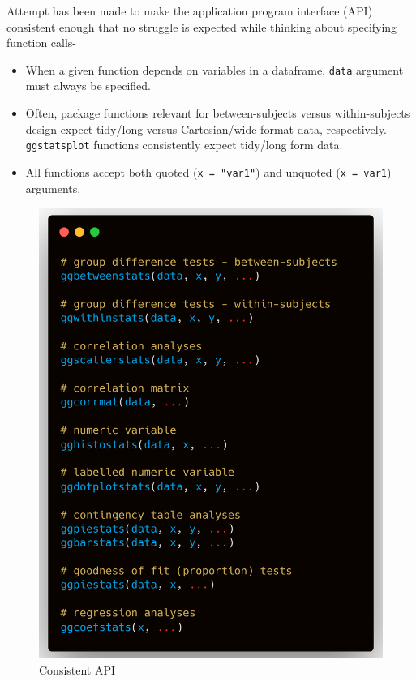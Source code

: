 \documentclass[
]{article}
\providecommand{\tightlist}{%
  \setlength{\itemsep}{0pt}\setlength{\parskip}{0pt}}
\begin{document}
Attempt has been made to make the application program interface (API) consistent
enough that no struggle is expected while thinking about specifying function
calls-

\begin{itemize}
\tightlist
\item
  When a given function depends on variables in a dataframe, \texttt{data} argument
  must always be specified.
\item
  Often, package functions relevant for between-subjects versus
  within-subjects design expect tidy/long versus Cartesian/wide format data,
  respectively. \texttt{ggstatsplot} functions consistently expect tidy/long form
  data.
\item
  All functions accept both quoted (\texttt{x\ =\ "var1"}) and unquoted (\texttt{x\ =\ var1})
  arguments.
\end{itemize}

\begin{figure}
\centering
\includegraphics{figures/arguments.png}
\caption{Consistent API}
\end{figure}
\end{document}
